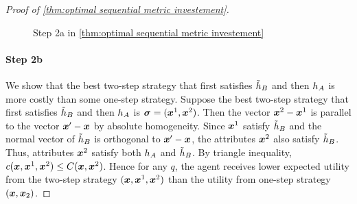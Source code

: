 \begin{proof}[Proof of \cref{thm:optimal sequential metric investement}]
\begin{figure}[t]
\caption{Step 2a in \cref{thm:optimal sequential metric investement}}
\label{fig: general cost investment optimal sequential case 1}
\end{figure}


\paragraph{Step 2b} We show that the best two-step strategy that first satisfies $\tilde{h}_B$ and then $h_A$ is more costly than some one-step strategy.
Suppose the best two-step strategy that first satisfies $\tilde{h}_B$ and then $h_A$ is $\boldsymbol{\sigma}=(\boldsymbol{x}^1,\boldsymbol{x}^2)$.
Then the vector $\boldsymbol{x}^2-\boldsymbol{x}^1$ is parallel to the vector $\boldsymbol{x}'-\boldsymbol{x}$ by absolute homogeneity.
Since $\boldsymbol{x}^1$ satisfy $\tilde{h}_B$ and the normal vector of $\tilde{h}_B$ is orthogonal to $\boldsymbol{x}'-\boldsymbol{x}$, the attributes $\boldsymbol{x}^2$ also satisfy $\tilde{h}_B$. 
Thus, attributes $\boldsymbol{x}^2$ satisfy both $h_A$ and $\tilde {h}_B$.
By triangle inequality, $c(\boldsymbol{x},\boldsymbol{x}^1,\boldsymbol{x}^2)\leq C(\boldsymbol{x},\boldsymbol{x}^2)$.
Hence for any $q$, the agent receives lower expected utility from the two-step strategy $(\boldsymbol{x},\boldsymbol{x}^1,\boldsymbol{x}^2)$ than the utility from one-step strategy $(\boldsymbol{x},\boldsymbol{x}_2)$.




\end{proof}
